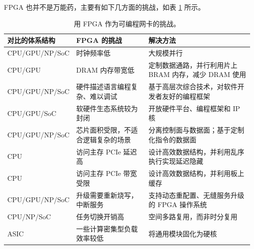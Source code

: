 




FPGA 也并不是万能药，主要有如下几方面的挑战，如表 \ref{background:tab:fpga-challenges} 所示。

\begin{table}[htbp]
	\centering
	\caption{用 FPGA 作为可编程网卡的挑战。}
	\small
	\begin{tabular}{l|p{}|p{}}
		\hline
		对比的体系结构 & FPGA 的挑战 & 解决方法 \\
		\hline
		\hline
		CPU/GPU/NP/SoC & 时钟频率低 & 大规模并行 \\
		\hline 
		CPU/GPU & DRAM 内存带宽低 & 定制数据通路，并行利用片上 BRAM 内存，减少 DRAM 使用 \\
		\hline
		CPU/GPU/NP/SoC & 硬件描述语言编程复杂、难以调试 & 基于高层次综合技术，对软件开发者友好的编程框架 \\
		\hline
		CPU/GPU/SoC & 软硬件生态系统较为封闭 & 开放硬件平台、编程框架和 IP 核 \\
		\hline
		CPU/GPU/NP/SoC & 芯片面积受限，不适合逻辑复杂的场景 & 分离控制面与数据面；基于定制化指令的数据面 \\
		\hline
		CPU & 访问主存 PCIe 延迟高 & 设计高效数据结构，并利用乱序执行实现延迟隐藏 \\
		\hline
		CPU & 访问主存 PCIe 带宽受限 & 设计高效数据结构，并利用板上缓存 \\
		\hline
		CPU/GPU/NP/SoC & 升级需要重新烧写，中断服务 & 支持动态重配置、无缝服务升级的 FPGA 操作系统 \\
		\hline
		CPU/NP/SoC & 任务切换开销高 & 空间多路复用，而非时分复用 \\
		\hline
		ASIC & 一些计算密集型负载效率较低 & 将通用模块固化为硬核 \\
		\hline
	\end{tabular}
	\label{background:tab:fpga-challenges}
\end{table}


